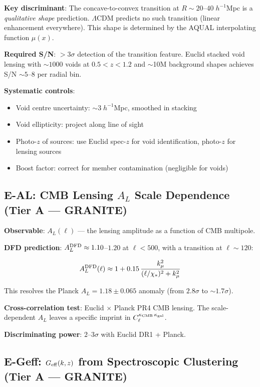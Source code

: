 \documentclass[11pt,a4paper]{article}
\newcommand{\LCDM}{$\Lambda$CDM}
\newcommand{\kmu}{k_\mu}
\newcommand{\Geff}{G_{\rm eff}}
\begin{document}
\textbf{Key discriminant}: The concave-to-convex transition at
$R \sim 20$--$40\;h^{-1}$Mpc is a \emph{qualitative shape} prediction.
\LCDM{} predicts no such transition (linear enhancement everywhere).
This shape is determined by the AQUAL interpolating function $\mu(x)$.

\textbf{Required S/N}: $> 3\sigma$ detection of the transition feature.
Euclid stacked void lensing with $\sim 1000$ voids at $0.5 < z < 1.2$
and $\sim$10M background shapes achieves S/N $\sim 5$--$8$ per radial bin.

\textbf{Systematic controls}:
\begin{itemize}[nosep]
\item Void centre uncertainty: $\sim 3\;h^{-1}$Mpc, smoothed in stacking
\item Void ellipticity: project along line of sight
\item Photo-$z$ of sources: use Euclid spec-$z$ for void identification,
  photo-$z$ for lensing sources
\item Boost factor: correct for member contamination (negligible for voids)
\end{itemize}


\subsection{E-AL: CMB Lensing $A_L$ Scale Dependence
(Tier A --- GRANITE)}
\label{sec:euclid-alens}

\textbf{Observable}: $A_L(\ell)$ --- the lensing amplitude as a function
of CMB multipole.

\textbf{DFD prediction}: $A_L^{\rm DFD} \approx 1.10$--$1.20$ at
$\ell < 500$, with a transition at $\ell \sim 120$:

\begin{equation}
A_L^{\rm DFD}(\ell) \approx 1 +
0.15\,\frac{\kmu^2}{(\ell/\chi_*)^2 + \kmu^2}
\end{equation}

This resolves the Planck $A_L = 1.18 \pm 0.065$ anomaly (from
$2.8\sigma$ to $\sim 1.7\sigma$).

\textbf{Cross-correlation test}: Euclid $\times$ Planck PR4 CMB lensing.
The scale-dependent $A_L$ leaves a specific imprint in
$C_\ell^{\kappa_{\rm CMB}\,\kappa_{\rm gal}}$.

\textbf{Discriminating power}: $2$--$3\sigma$ with Euclid DR1 + Planck.

\subsection{E-Geff: $\Geff(k,z)$ from Spectroscopic Clustering
(Tier A --- GRANITE)}
\label{sec:euclid-geff}
\end{document}
